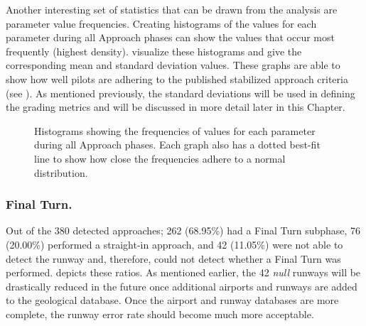     
    Another interesting set of statistics that can be drawn from the analysis are parameter value frequencies.  Creating histograms of the values for each parameter during all Approach phases can show the values that occur most frequently (highest density).   visualize these histograms and give the corresponding mean and standard deviation values.  These graphs are able to show how well pilots are adhering to the published stabilized approach criteria (see ).  As mentioned previously, the standard deviations will be used in defining the grading metrics and will be discussed in more detail later in this Chapter.
    
    \begin{figure}
    	\centering
        \hfill%
        
        \hfill%
        \caption{Histograms showing the frequencies of values for each parameter during all Approach phases.  Each graph also has a dotted best-fit line to show how close the frequencies adhere to a normal distribution.}
        \label{fig:approach_histograms}
    \end{figure}
    
    
        \subsubsection{Final Turn.}
        
        	Out of the 380 detected approaches; 262 (68.95\%) had a Final Turn subphase, 76 (20.00\%) performed a straight-in approach, and 42 (11.05\%) were not able to detect the runway and, therefore, could not detect whether a Final Turn was performed.   depicts these ratios.  As mentioned earlier, the 42 \textit{null} runways will be drastically reduced in the future once additional airports and runways are added to the geological database.  Once the airport and runway databases are more complete, the runway error rate should become much more acceptable.
            
